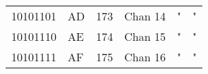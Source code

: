 \begin{center}
\begin{supertabular}{| C{2cm} | C{1.5cm} | C{1.5cm} | C{5.3cm} | C{1.5cm} | C{1.5cm} |}
                10101101 & AD & 173 & Chan 14  &                   "                    &                    "                        \\
             10101110 & AE & 174 & Chan 15  &                   "                    &                    "                        \\
                10101111 & AF & 175 & Chan 16  &                   "                    &                    "                        \\
        \end{supertabular}
        \end{center}



